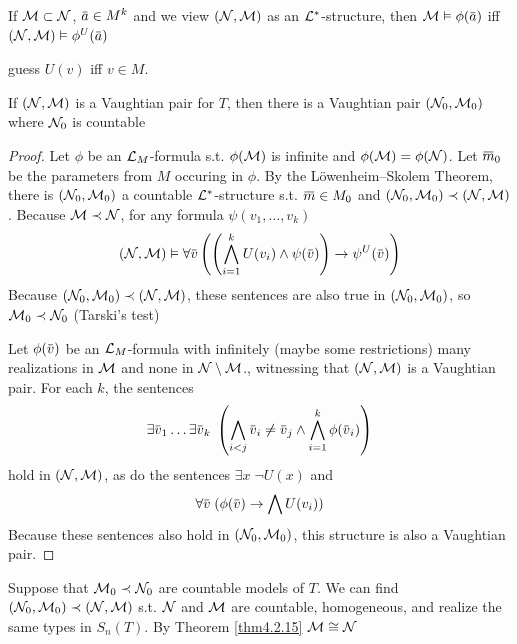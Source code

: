 \documentclass[11pt]{article}
\begin{document}
If \(\mathcal{M}\subset\mathcal{N}\), \(\bara\in M^k\) and we view \((\mathcal{N},\mathcal{M})\) as an \(\mathcal{L}^*\)-structure, then \(\calm\vDash\phi(\bara)\)
iff \((\caln,\calm)\vDash\phi^U(\bara)\)

guess \(U(v)\) iff \(v\in M\).

\begin{lemma}[]
\label{lemma4.3.37}
If \((\mathcal{N},\mathcal{M})\) is a Vaughtian pair for \(T\), then there is a Vaughtian pair \((\mathcal{N}_0,\mathcal{M}_0)\)
where \(\mathcal{N}_0\) is countable
\end{lemma}

\begin{proof}
Let \(\phi\) be an \(\mathcal{L}_M\)-formula s.t. \(\phi(\mathcal{M})\) is infinite and \(\phi(\mathcal{M})=\phi(\mathcal{N})\). Let \(\barm_0\) be the
parameters from \(M\) occuring in \(\phi\). By the Löwenheim–Skolem Theorem, there is \((\mathcal{N}_0,\mathcal{M}_0)\) a
countable \(\mathcal{L}^*\)-structure s.t. \(\barm\in M_0\) and \((\mathcal{N}_0,\mathcal{M}_0)\prec(\mathcal{N},\mathcal{M})\). Because \(\mathcal{M}\prec\mathcal{N}\), for
any formula \(\psi(v_1,\dots,v_k)\)
\begin{equation*}
(\caln,\calm)\vDash\forall\barv\left( \left( \bigwedge_{i=1}^kU(v_i)\wedge\psi(\barv) \right)\to\psi^U(\barv) \right)
\end{equation*}
Because \((\mathcal{N}_0,\mathcal{M}_0)\prec(\mathcal{N},\mathcal{M})\), these sentences are also true in \((\mathcal{N}_0,\mathcal{M}_0)\), so \(\mathcal{M}_0\prec\mathcal{N}_0\)
(Tarski's test)

Let \(\phi(\barv)\) be an \(\mathcal{L}_M\)-formula with infinitely (maybe some restrictions) many realizations in \(\mathcal{M}\) and none
in \(\mathcal{N}\setminus\mathcal{M}\)., witnessing that \((\mathcal{N},\mathcal{M})\) is a Vaughtian pair. For each \(k\), the sentences
\begin{equation*}
\exists\barv_1\dots\exists\barv_k\;\left( \bigwedge_{i<j}\barv_i\neq\barv_j\wedge\bigwedge_{i=1}^k\phi(\barv_i) \right)
\end{equation*}
hold in \((\mathcal{N},\mathcal{M})\), as do the sentences \(\exists x\;\neg U(x)\) and
\begin{equation*}
\forall\barv\;(\phi(\barv)\to\bigwedge U(v_i))
\end{equation*}
Because these sentences also hold in \((\mathcal{N}_0,\mathcal{M}_0)\), this structure is also a Vaughtian pair.
\end{proof}

\begin{lemma}[]
Suppose that \(\mathcal{M}_0\prec\mathcal{N}_0\) are countable models of \(T\). We can find \((\mathcal{N}_0,\mathcal{M}_0)\prec(\mathcal{N},\mathcal{M})\)
s.t. \(\mathcal{N}\) and \(\mathcal{M}\) are countable, homogeneous, and realize the same types in \(S_n(T)\). By
Theorem \ref{thm4.2.15} \(\mathcal{M}\cong\mathcal{N}\)
\end{lemma}
\end{document}
